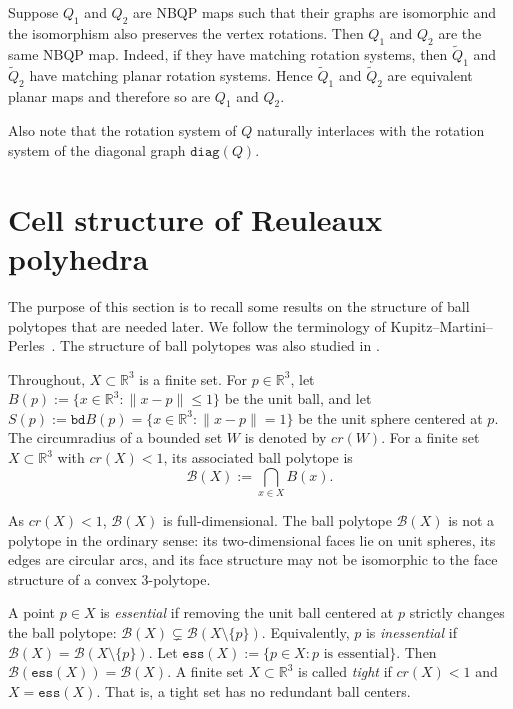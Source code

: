 \documentclass[10pt,a4paper]{article}
\newcommand{\R}[0]{\mathbb{R}}
\newcommand{\Bc}[0]{\mathcal{B}}
\newcommand{\bd}[0]{\mathtt{bd}}
\newcommand{\diag}[0]{\mathtt{diag}}
\newcommand{\ess}[0]{\mathtt{ess}}
\begin{document}
Suppose $Q_1$ and $Q_2$ are NBQP maps such that their graphs are isomorphic and the isomorphism also preserves the vertex rotations. Then $Q_1$ and $Q_2$ are the same NBQP map. Indeed, if they have matching rotation systems, then $\widetilde Q_1$ and $\widetilde Q_2$ have matching planar rotation systems. Hence $\widetilde Q_1$ and $\widetilde Q_2$ are equivalent planar maps and therefore so are $Q_1$ and $Q_2$.

Also note that the rotation system of $Q$ naturally interlaces with the rotation system of the diagonal graph $\diag(Q)$. 









 
 

 
 






\section{Cell structure of Reuleaux polyhedra}\label{sec:cellstructure}
The purpose of this section is to recall some results on the structure of ball polytopes that are needed later. We follow the terminology of Kupitz--Martini--Perles~\cite{kupitz2010ball}. The structure of ball polytopes was also studied in \cite{bezdek2007ball,martini2019bodies,almohammad2022analogue,lopez2023borsuk}. 

Throughout, $X\subset \R^3$ is a finite set.  For $p\in\R^3$, let $B(p):=\{x\in \R^3:\|x-p\|\leq 1\}$ be the unit ball, and let $S(p):=\bd B(p)=\{x\in \R^3:\|x-p\|=1\}$ be the unit sphere centered at $p$. The circumradius of a bounded set \(W\) is denoted by \(cr(W)\). For a finite set \(X\subset \R^3\) with $cr(X)<1$, its associated ball polytope is
$$
        \Bc(X):=\bigcap_{x\in X} B(x).
$$


As $cr(X)<1$, $\Bc(X)$ is full-dimensional. The ball polytope $\Bc(X)$ is not a polytope in the ordinary sense: its two-dimensional faces lie on unit spheres, its edges are circular arcs, and its face structure may not be isomorphic to the face structure of a convex 3-polytope.


A point $p\in X$ is \emph{essential} if removing the unit ball centered at $p$ strictly changes the ball polytope: $        \Bc(X)\subsetneq \Bc(X\setminus\{p\})$. Equivalently, $p$ is \emph{inessential} if $\Bc(X)=\Bc(X\setminus\{p\})$. Let $\ess(X):=\{p\in X:p\text{ is essential}\}$. Then  $\Bc(\ess(X))=\Bc(X)$. A finite set $X\subset\R^3$ is called \emph{tight} if $cr(X)<1$ and $X=\ess(X)$. That is, a tight set has no redundant ball centers.
\end{document}
